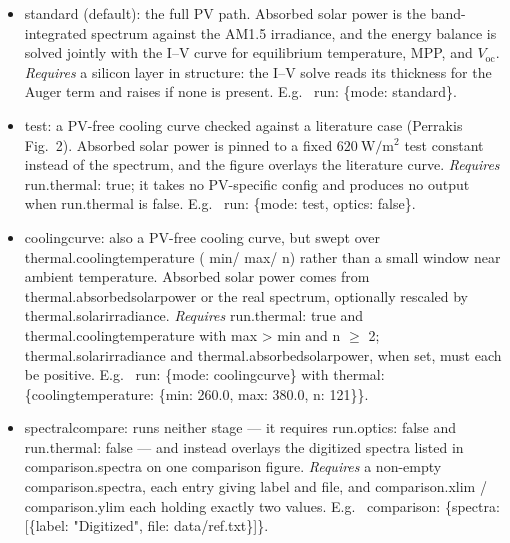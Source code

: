 \documentclass[11pt,a4paper,twoside]{article}
\DeclareRobustCommand{\code}[1]{\begingroup\upshape\ttfamily
  \def\_{\allowbreak\textunderscore\allowbreak}#1\endgroup}
\begin{document}
\begin{itemize}
  \item \code{standard} (default): the full PV path. Absorbed solar power is
        the band-integrated spectrum against the AM1.5 irradiance, and the
        energy balance is solved jointly with the I--V curve for equilibrium
        temperature, MPP, and \(V_{\mathrm{oc}}\).
        \textit{Requires} a \code{silicon} layer in \code{structure}: the
        I--V solve reads its thickness for the Auger term and raises if none
        is present. E.g.\ \code{run: \{mode: standard\}}.
  \item \code{test}: a PV-free cooling curve checked against a literature case
        (Perrakis Fig.~2). Absorbed solar power is pinned to a fixed
        \(620\ \mathrm{W/m^2}\) test constant instead of the spectrum, and the
        figure overlays the literature curve.
        \textit{Requires} \code{run.thermal: true}; it takes no PV-specific
        config and produces no output when \code{run.thermal} is false. E.g.\
        \code{run: \{mode: test, optics: false\}}.
  \item \code{cooling\_curve}: also a PV-free cooling curve, but swept over
        \code{thermal.cooling\_temperature} (\code{min}/\code{max}/\code{n})
        rather than a small window near ambient temperature. Absorbed solar
        power comes from \code{thermal.absorbed\_solar\_power} or the real
        spectrum, optionally rescaled by \code{thermal.solar\_irradiance}.
        \textit{Requires} \code{run.thermal: true} and
        \code{thermal.cooling\_temperature} with \code{max > min} and
        \code{n} \(\geq\) \code{2}; \code{thermal.solar\_irradiance} and
        \code{thermal.absorbed\_solar\_power}, when set, must each be
        positive. E.g.\ \code{run: \{mode: cooling\_curve\}} with
        \code{thermal: \{cooling\_temperature: \{min: 260.0, max: 380.0,
        n: 121\}\}}.
  \item \code{spectral\_compare}: runs neither stage --- it requires
        \code{run.optics: false} and \code{run.thermal: false} --- and instead
        overlays the digitized spectra listed in \code{comparison.spectra}
        on one comparison figure.
        \textit{Requires} a non-empty \code{comparison.spectra}, each entry
        giving \code{label} and \code{file}, and \code{comparison.xlim} /
        \code{comparison.ylim} each holding exactly two values. E.g.\
        \code{comparison: \{spectra: [\{label: "Digitized", file:
        data/ref.txt\}]\}}.
\end{itemize}
\end{document}
